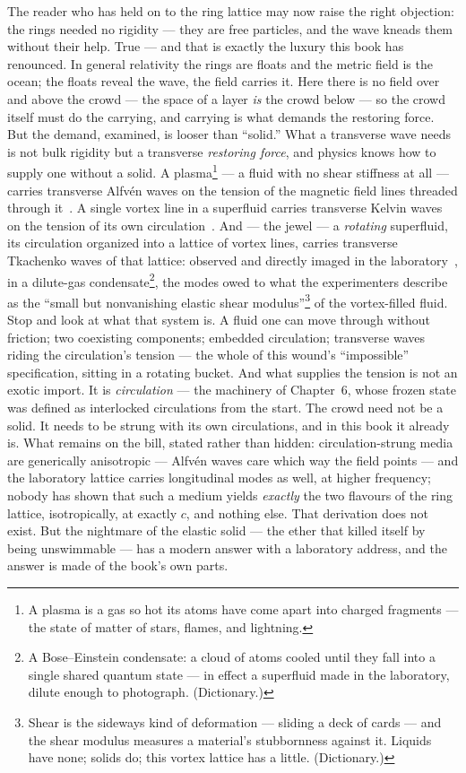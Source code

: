 \documentclass[fontsize=11pt,paper=a4,pagesize=auto,parskip=half-]{scrbook}
\begin{document}
The reader who has held on to the ring lattice may now raise the right objection: the rings needed no rigidity --- they are free particles, and the wave kneads them without their help. True --- and that is exactly the luxury this book has renounced. In general relativity the rings are floats and the metric field is the ocean; the floats reveal the wave, the field carries it. Here there is no field over and above the crowd --- the space of a layer \emph{is} the crowd below --- so the crowd itself must do the carrying, and carrying is what demands the restoring force. But the demand, examined, is looser than ``solid.'' What a transverse wave needs is not bulk rigidity but a transverse \emph{restoring force}, and physics knows how to supply one without a solid. A plasma\footnote{A plasma is a gas so hot its atoms have come apart into charged fragments --- the state of matter of stars, flames, and lightning.} --- a fluid with no shear stiffness at all --- carries transverse Alfv\'en waves on the tension of the magnetic field lines threaded through it~\cite{alfven1942}. A single vortex line in a superfluid carries transverse Kelvin waves on the tension of its own circulation~\cite{thomson1880}. And --- the jewel --- a \emph{rotating} superfluid, its circulation organized into a lattice of vortex lines, carries transverse Tkachenko waves of that lattice: observed and directly imaged in the laboratory~\cite{coddington2003}, in a dilute-gas condensate\footnote{A Bose--Einstein condensate: a cloud of atoms cooled until they fall into a single shared quantum state --- in effect a superfluid made in the laboratory, dilute enough to photograph. (Dictionary.)}, the modes owed to what the experimenters describe as the ``small but nonvanishing elastic shear modulus''\footnote{Shear is the sideways kind of deformation --- sliding a deck of cards --- and the shear modulus measures a material's stubbornness against it. Liquids have none; solids do; this vortex lattice has a little. (Dictionary.)} of the vortex-filled fluid. Stop and look at what that system is. A fluid one can move through without friction; two coexisting components; embedded circulation; transverse waves riding the circulation's tension --- the whole of this wound's ``impossible'' specification, sitting in a rotating bucket. And what supplies the tension is not an exotic import. It is \emph{circulation} --- the machinery of Chapter~6, whose frozen state was defined as interlocked circulations from the start. The crowd need not be a solid. It needs to be strung with its own circulations, and in this book it already is. What remains on the bill, stated rather than hidden: circulation-strung media are generically anisotropic --- Alfv\'en waves care which way the field points --- and the laboratory lattice carries longitudinal modes as well, at higher frequency; nobody has shown that such a medium yields \emph{exactly} the two flavours of the ring lattice, isotropically, at exactly $c$, and nothing else. That derivation does not exist. But the nightmare of the elastic solid --- the ether that killed itself by being unswimmable --- has a modern answer with a laboratory address, and the answer is made of the book's own parts.
\end{document}

